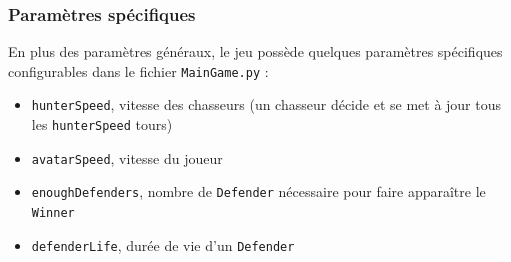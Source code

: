 \documentclass[a4paper]{article}
\begin{document}
\subsubsection{Paramètres spécifiques}

En plus des paramètres généraux, le jeu possède quelques paramètres spécifiques configurables dans le fichier \texttt{MainGame.py} :
\begin{itemize}
\item \texttt{hunterSpeed}, vitesse des chasseurs (un chasseur décide et se met à jour tous les \texttt{hunterSpeed} tours)
\item \texttt{avatarSpeed}, vitesse du joueur
\item \texttt{enoughDefenders}, nombre de \texttt{Defender} nécessaire pour faire apparaître le \texttt{Winner}
\item \texttt{defenderLife}, durée de vie d'un \texttt{Defender}
\end{itemize}
\end{document}
